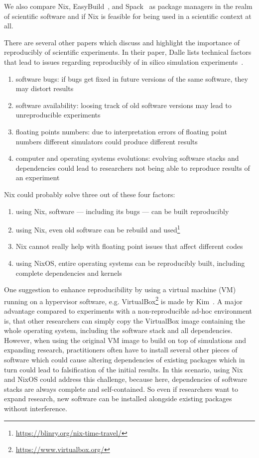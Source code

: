 \documentclass{eceasst}
\begin{document}
We also compare Nix, EasyBuild~\cite{easybuil6495863}, and Spack~\cite{spack7832814} as package managers in the realm of scientific software and if Nix is feasible for being used in a scientific context at all.

There are several other papers which discuss and highlight the importance of reproducibly of scientific experiments.
In their paper, Dalle lists technical factors that lead to issues regarding reproducibly of in silico simulation experiments~\cite{Dalle_2012}.
\begin{enumerate}
    \item software bugs: if bugs get fixed in future versions of the same software, they may distort results
    \item software availability: loosing track of old software versions may lead to unreproducible experiments
    \item floating points numbers: due to interpretation errors of floating point numbers different simulators could produce different results
    \item computer and operating systems evolutions: evolving software stacks and dependencies could lead to researchers not being able to reproduce results of an experiment
\end{enumerate}
Nix could probably solve three out of these four factors:
\begin{enumerate}
    \item using Nix, software --- including its bugs --- can be built reproducibly
    \item using Nix, even old software can be rebuild and used\footnote{\url{https://blinry.org/nix-time-travel/}}
    \item Nix cannot really help with floating point issues that affect different codes
    \item using NixOS, entire operating systems can be reproducibly built, including complete dependencies and kernels
\end{enumerate}

One suggestion to enhance reproducibility by using a virtual machine (VM) running on a hypervisor software, e.g. VirtualBox\footnote{\url{https://www.virtualbox.org/}} is made by Kim~\cite{Kim_2019}.
A major advantage compared to experiments with a non-reproducible ad-hoc environment is, that other researchers can simply copy the VirtualBox image containing the whole operating system, including the software stack and all dependencies.
However, when using the original VM image to build on top of simulations and expanding research, practitioners often have to install several other pieces of software which could cause altering dependencies of existing packages which in turn could lead to falsification of the initial results.
In this scenario, using Nix and NixOS could address this challenge, because here, dependencies of software stacks are always complete and self-contained.
So even if researchers want to expand research, new software can be installed alongside existing packages without interference.
\end{document}
